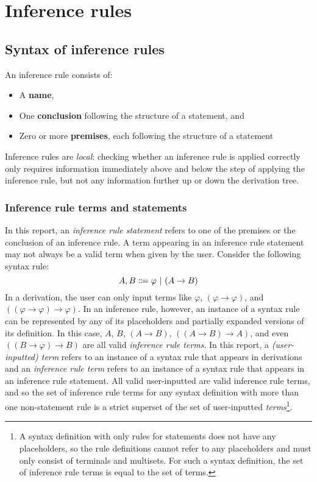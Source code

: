 \chapter{Inference rules}
\label{chapter:inference}
\section{Syntax of inference rules}
An inference rule consists of:
\begin{itemize}
    \item A \textbf{name},
    \item One \textbf{conclusion} following the structure of a statement, and
    \item Zero or more \textbf{premises}, each following the structure of a statement
\end{itemize}
Inference rules are \textit{local}: checking whether an inference rule is applied correctly only requires information immediately above and below the step of applying the inference rule, but not any information further up or down the derivation tree.

\subsection{Inference rule terms and statements}
In this report, an \textit{inference rule statement} refers to one of the premises or the conclusion of an inference rule. A term appearing in an inference rule statement may not always be a valid term when given by the user. Consider the following syntax rule:
\[
    A, B \Coloneqq \varphi \ |\  (A \to B)
\]
In a derivation, the user can only input terms like $\varphi$, $(\varphi \to \varphi)$, and $((\varphi \to \varphi) \to \varphi)$. In an inference rule, however, an instance of a syntax rule can be represented by any of its placeholders and partially expanded versions of its definition. In this case, $A$, $B$, $(A \to B)$, $((A \to B) \to A)$, and even $((B \to \varphi) \to B)$ are all valid \textit{inference rule terms}. In this report, a \textit{(user-inputted) term} refers to an instance of a syntax rule that appears in derivations and an \textit{inference rule term} refers to an instance of a syntax rule that appears in an inference rule statement. All valid user-inputted are valid inference rule terms, and so the set of inference rule terms for any syntax definition with more than one non-statement rule is a strict superset of the set of user-inputted \textit{terms}\footnote{A syntax definition with only rules for statements does not have any placeholders, so the rule definitions cannot refer to any placeholders and must only consist of terminals and multisets. For such a syntax definition, the set of inference rule terms is equal to the set of terms.}.

